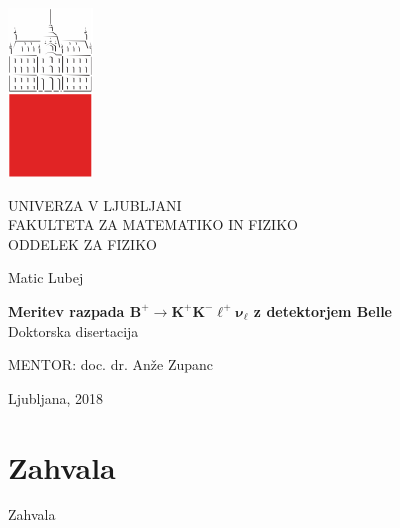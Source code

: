 \cleardoublepage
\begin{otherlanguage}{slovene}
\begin{center}

\includegraphics{fig/logo2}

{\large UNIVERZA V LJUBLJANI\\
FAKULTETA ZA MATEMATIKO IN FIZIKO\\
ODDELEK ZA FIZIKO\\}

\vspace{5cm}

{\Large Matic Lubej\\}

\vspace{10mm}

{\bf \Large Meritev razpada $\bm{B^+ \to K^+K^-\ell^+\nu_\ell}$ z detektorjem Belle\\}
\vspace{5mm}
{\large Doktorska disertacija}\\

\vfill

{\large MENTOR: doc. dr. An\v ze Zupanc\\
}



\vspace{2cm}

{\large Ljubljana, 2018}

\end{center}



\cleardoublepage

\pagestyle{plain}
\vfill
\chapter*{Zahvala}
Zahvala
\pagestyle{empty}


\cleardoublepage

\end{otherlanguage}
